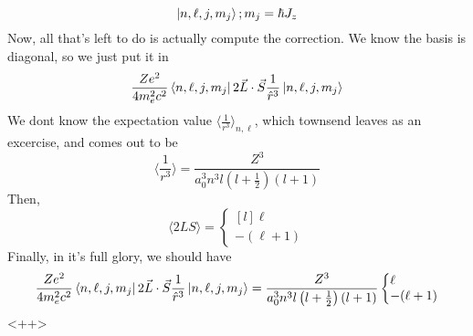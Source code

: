 \documentclass{article}
\theoremstyle{definition}
\begin{document}
\begin{equation} \ket{n,\ell,j,m_j};m_j=\hbar J_z \end{equation} Now, all that's left to do is actually compute the correction. We know the basis is diagonal, so we just put it in \begin{equation} \frac{Ze^2}{4m_e^2c^2}\bra{n,\ell,j,m_j}2\vec{L}\cdot\vec{S}\frac{1}{\hat r^3}\ket{n,\ell,j,m_j} \end{equation} We dont know the expectation value $\langle\frac{1}{r^3}\rangle_{n,\ell}$, which townsend leaves as an excercise, and comes out to be \begin{equation} \langle\frac{1}{r^3}\rangle=\frac{Z^3}{a_0^3n^3l\left(l+\frac{1}{2}\right)\left(l+1\right)} \end{equation} Then, \begin{equation} \langle2LS\rangle=\left\{\begin{matrix*}[l]\ell\\-(\ell+1)\end{matrix*}\right. \end{equation} Finally, in it's full glory, we should have \begin{equation} \frac{Ze^2}{4m_e^2c^2}\bra{n,\ell,j,m_j}2\vec{L}\cdot\vec{S}\frac{1}{\hat r^3}\ket{n,\ell,j,m_j} = \frac{Z^3}{a_0^3n^3l\left(l+\frac{1}{2}\right)\left(l+1\right)} \left\{\begin{matrix*}[l]\ell\\-(\ell+1)\end{matrix*}\right. \end{equation} <++>
\end{document}
